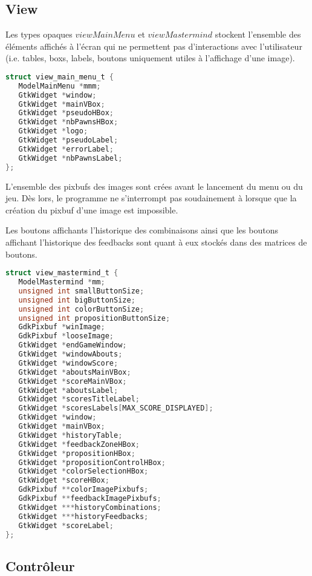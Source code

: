 \subsection{View}
Les types opaques $viewMainMenu$ et $viewMastermind$ stockent l'ensemble des éléments affichés à l'écran qui ne permettent pas d'interactions avec l'utilisateur (i.e. tables, boxs, labels, boutons uniquement utiles à l'affichage d'une image).

\begin{lstlisting}[language=C]
struct view_main_menu_t {
   ModelMainMenu *mmm;
   GtkWidget *window;
   GtkWidget *mainVBox;
   GtkWidget *pseudoHBox;
   GtkWidget *nbPawnsHBox;
   GtkWidget *logo;
   GtkWidget *pseudoLabel;
   GtkWidget *errorLabel;
   GtkWidget *nbPawnsLabel;
};
\end{lstlisting}

L'ensemble des pixbufs des images sont crées avant le lancement du menu ou du jeu. Dès lors, le programme ne s'interrompt pas soudainement à lorsque que la création du pixbuf d'une image est impossible.  

Les boutons affichants l'historique des combinaisons ainsi que les boutons affichant l'historique des feedbacks sont quant à eux stockés dans des matrices de boutons.

\begin{lstlisting}[language=C]
struct view_mastermind_t {
   ModelMastermind *mm;
   unsigned int smallButtonSize;
   unsigned int bigButtonSize;
   unsigned int colorButtonSize;
   unsigned int propositionButtonSize;
   GdkPixbuf *winImage;
   GdkPixbuf *looseImage;
   GtkWidget *endGameWindow;
   GtkWidget *windowAbouts;
   GtkWidget *windowScore;
   GtkWidget *aboutsMainVBox;
   GtkWidget *scoreMainVBox;
   GtkWidget *aboutsLabel;
   GtkWidget *scoresTitleLabel;
   GtkWidget *scoresLabels[MAX_SCORE_DISPLAYED];
   GtkWidget *window;
   GtkWidget *mainVBox;
   GtkWidget *historyTable;
   GtkWidget *feedbackZoneHBox;
   GtkWidget *propositionHBox;
   GtkWidget *propositionControlHBox;
   GtkWidget *colorSelectionHBox;
   GtkWidget *scoreHBox;
   GdkPixbuf **colorImagePixbufs;
   GdkPixbuf **feedbackImagePixbufs;
   GtkWidget ***historyCombinations;
   GtkWidget ***historyFeedbacks;
   GtkWidget *scoreLabel;
};
\end{lstlisting}

\subsection{Contrôleur}

